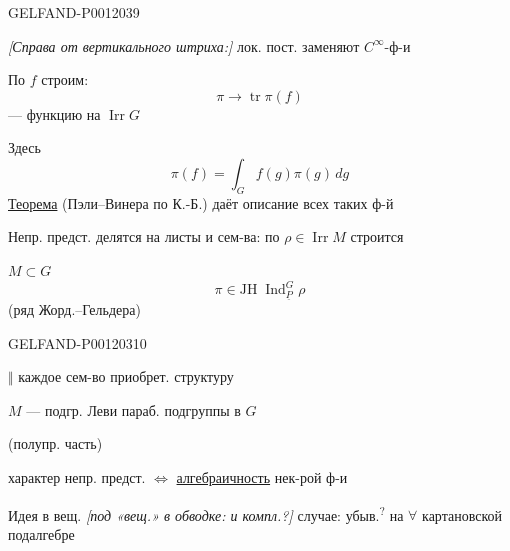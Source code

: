 \begin{GelfandAdjacentEvidence}{GELFAND-P001203}{9}


\textit{[Справа от вертикального штриха:]} лок. пост. заменяют \(C^\infty\)-ф-и

По \(f\) строим:
\[
\pi\longrightarrow\operatorname{tr}\pi(f)
\]
--- функцию на \(\operatorname{Irr}G\)

Здесь
\[
\pi(f)=\int_G f(g)\pi(g)\,dg
\]
\underline{Теорема} (Пэли--Винера по К.-Б.) даёт описание всех таких ф-й

Непр. предст. делятся на листы и сем-ва: по \(\rho\in\operatorname{Irr}M\) строится

\(M\subset G\)
\[
\pi\in\mathrm{JH}\;\operatorname{Ind}_{\underline{P}}^{G}\rho
\]
(ряд Жорд.--Гельдера)
\end{GelfandAdjacentEvidence}
\begin{GelfandAdjacentEvidence}{GELFAND-P001203}{10}


\(\Vert\) каждое сем-во приобрет. структуру

\(M\) --- подгр. Леви параб. подгруппы в \(G\)

(полупр. часть)

характер непр. предст. \(\Leftrightarrow\) \underline{алгебраичность} нек-рой ф-и

Идея в вещ. \textit{[под «вещ.» в обводке: и компл.?]} случае: убыв.\textsuperscript{?} на \(\forall\) картановской подалгебре
\end{GelfandAdjacentEvidence}



